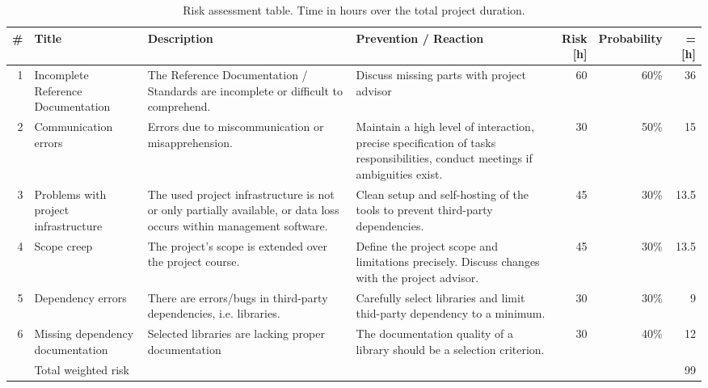 \begin{table}
    \centering
    \caption[Risk assessment]{Risk assessment table. Time in hours over the total project duration.}
    \label{tbl:project-risks}
    \begin{tabu}{r l X X r r r}
        \hline
        \# & Title & Description & Prevention / Reaction & Risk [h] & Probability & = [h] \\ \hline

        1 & Incomplete Reference Documentation
          & The Reference Documentation / Standards are incomplete or difficult to comprehend.
          & Discuss missing parts with project advisor
          & 60 & 60\% & 36\\

        2 & Communication errors
          & Errors due to miscommunication or misapprehension.
          & Maintain a high level of interaction, precise specification of tasks responsibilities, conduct meetings if ambiguities exist.
          & 30 & 50\% & 15\\

        3 & Problems with project infrastructure
          & The used project infrastructure is not or only partially available, or data loss occurs within management software.
          & Clean setup and self-hosting of the tools to prevent third-party dependencies.
          & 45 & 30\% & 13.5 \\

        4 & Scope creep
          & The project's scope is extended over the project course.
          & Define the project scope and limitations precisely. Discuss changes with the project advisor.
          & 45 & 30\% & 13.5\\

        5 & Dependency errors
          & There are errors/bugs in third-party dependencies, i.e. libraries.
          & Carefully select libraries and limit thid-party dependency to a minimum.
          & 30 & 30\% & 9\\

        6 & Missing dependency documentation
          & Selected libraries are lacking proper documentation
          & The documentation quality of a library should be a selection criterion.
          & 30 & 40\% & 12\\

         \hline
        & Total weighted risk & & & & & 99\\
        \hline
    \end{tabu}
\end{table}


